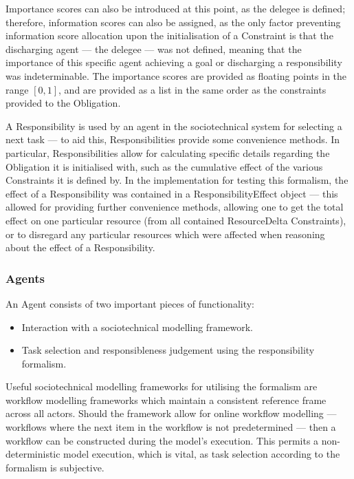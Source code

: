 Importance scores can also be introduced at this point, as the delegee is defined; therefore, information scores can also be assigned, as the only factor preventing information score allocation upon the initialisation of a Constraint is that the discharging agent --- the delegee --- was not defined, meaning that the importance of this specific agent achieving a goal or discharging a responsibility was indeterminable. The importance scores are provided as floating points in the range \([0,1]\), and are provided as a list in the same order as the constraints provided to the Obligation.\par

A Responsibility is used by an agent in the sociotechnical system for selecting a next task --- to aid this, Responsibilities provide some convenience methods. In particular, Responsibilities allow for calculating specific details regarding the Obligation it is initialised with, such as the cumulative effect of the various Constraints it is defined by. In the implementation for testing this formalism, the effect of a Responsibility was contained in a ResponsibilityEffect object --- this allowed for providing further convenience methods, allowing one to get the total effect on one particular resource (from all contained ResourceDelta Constraints), or to disregard any particular resources which were affected when reasoning about the effect of a Responsibility.\par

\subsubsection{Agents}  %
An Agent consists of two important pieces of functionality:

\begin{itemize}
    \item Interaction with a sociotechnical modelling framework.
    \item Task selection and responsibleness judgement using the responsibility formalism.
\end{itemize}

Useful sociotechnical modelling frameworks for utilising the formalism are workflow modelling frameworks which maintain a consistent reference frame across all actors. Should the framework allow for online workflow modelling --- workflows where the next item in the workflow is not predetermined --- then a workflow can be constructed during the model's execution. This permits a non-deterministic model execution, which is vital, as task selection according to the formalism is subjective.\par

